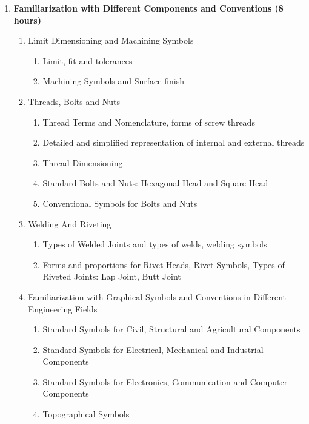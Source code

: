 \begin{enumerate}
    \item \textbf{Familiarization with Different Components and Conventions \hfill (8 hours)}
    \begin{enumerate}
        \item Limit Dimensioning and Machining Symbols
        \begin{enumerate}
            \item Limit, fit and tolerances
            \item Machining Symbols and Surface finish
        \end{enumerate}
        \item Threads, Bolts and Nuts
        \begin{enumerate}
            \item Thread Terms and Nomenclature, forms of screw threads
            \item Detailed and simplified representation of internal and external threads
            \item Thread Dimensioning
            \item Standard Bolts and Nuts: Hexagonal Head and Square Head
            \item Conventional Symbols for Bolts and Nuts
        \end{enumerate}
        
        \item Welding And Riveting
        \begin{enumerate}
            \item Types of Welded Joints and types of welds, welding symbols
            \item Forms and proportions for Rivet Heads, Rivet Symbols, Types of Riveted Joints: Lap Joint, Butt Joint
        \end{enumerate}
        
        \item Familiarization with Graphical Symbols and Conventions in Different Engineering Fields 
        \begin{enumerate}
            \item Standard Symbols for Civil, Structural and Agricultural Components
            \item Standard Symbols for Electrical, Mechanical and Industrial Components
            \item Standard Symbols for Electronics, Communication and Computer Components
            \item Topographical Symbols
        \end{enumerate}
        

\end{enumerate}
\end{enumerate}

